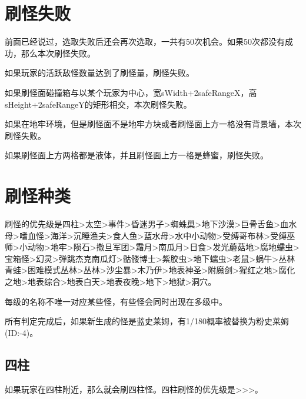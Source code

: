 \section{刷怪失败}
前面已经说过，选取失败后还会再次选取，一共有50次机会。如果50次都没有成功，那么本次刷怪失败。

如果玩家的活跃敌怪数量达到了刷怪量，刷怪失败。

如果刷怪面碰撞箱与以某个玩家为中心，宽sWidth+2safeRangeX，高sHeight+2safeRangeY的矩形相交，本次刷怪失败。

如果在地牢环境，但是刷怪面不是地牢方块或者刷怪面上方一格没有背景墙，本次刷怪失败。

如果刷怪面上方两格都是液体，并且刷怪面上方一格是蜂蜜，刷怪失败。

\section{刷怪种类}
刷怪的优先级是四柱>太空>事件>昏迷男子>蜘蛛巢>地下沙漠>巨骨舌鱼>血水母>嗜血怪>海洋>沉睡渔夫>食人鱼>蓝水母>水中小动物>受缚哥布林>受缚巫师>小动物>地牢>陨石>撒旦军团>霜月>南瓜月>日食>发光蘑菇地>腐地蠕虫>宝箱怪>幻灵>弹跳杰克南瓜灯>骷髅博士>紫胶虫>地下蠕虫>老鼠>蜗牛>丛林青蛙>困难模式丛林>丛林>沙尘暴>木乃伊>地表神圣>附魔剑>猩红之地>腐化之地>地表综合>地表白天>地表夜晚>地下>地狱>洞穴。

每级的名称不唯一对应某些怪，有些怪会同时出现在多级中。

所有判定完成后，如果新生成的怪是蓝史莱姆，有1/180概率被替换为粉史莱姆(ID:-4)。

\subsection{四柱}
如果玩家在四柱附近，那么就会刷四柱怪。四柱刷怪的优先级是>>>。

